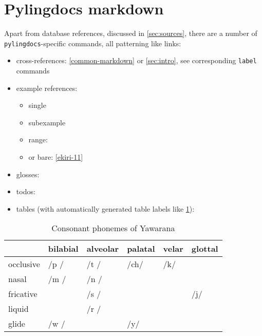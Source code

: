 \documentclass{article}
\begin{document}
\section{\texorpdfstring{Pylingdocs markdown
\label{pld-md}}{Pylingdocs markdown }}

Apart from database references, discussed in \cref{sec:sources}, there
are a number of \texttt{pylingdocs}-specific commands, all patterning
like links:

\begin{itemize}
\tightlist
\item
  cross-references: \cref{common-markdown} or \cref{sec:intro}, see
  corresponding \texttt{label} commands
\item
  example references:

  \begin{itemize}
  \tightlist
  \item
    single 
  \item
    subexample 
  \item
    range: 
  \item
    or bare: \ref{ekiri-11}
  \end{itemize}
\item
  glosses: 
\item
  todos:
\item
  tables (with automatically generated table labels like
  \cref{tab:consonants}):
\end{itemize}

\begin{table}
\caption{Consonant phonemes of Yawarana}
\label{tab:consonants}
\centering
\begin{tabular}{llllll}
\toprule
          & bilabial & alveolar & palatal & velar & glottal \\
\midrule
occlusive &     /p / &     /t / &    /ch/ &   /k/ &         \\
    nasal &     /m / &     /n / &         &       &         \\
fricative &          &     /s / &         &       &     /j/ \\
   liquid &          &     /r / &         &       &         \\
    glide &     /w / &          &     /y/ &       &         \\
\bottomrule
\end{tabular}

\end{table}
\end{document}
